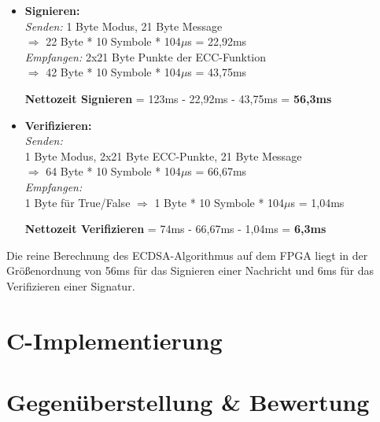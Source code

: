 \begin{itemize}
	\item \textbf{Signieren:}\\
\textit{Senden:} 
1 Byte Modus, 21 Byte Message\\
$\Rightarrow$ 22 Byte * 10 Symbole * 104$\mu$s = 22,92ms\\
\textit{Empfangen:} 
2x21 Byte Punkte der ECC-Funktion\\
$\Rightarrow$ 42 Byte  * 10 Symbole * 104$\mu$s = 43,75ms

\textbf{Nettozeit Signieren} = 123ms - 22,92ms - 43,75ms = \textbf{56,3ms}
	
	\item \textbf{Verifizieren:}\\
\textit{Senden:}\\
1 Byte Modus, 2x21 Byte ECC-Punkte, 21 Byte Message\\
$\Rightarrow$ 64 Byte * 10 Symbole * 104$\mu$s = 66,67ms\\
\textit{Empfangen:}\\
1 Byte für True/False
$\Rightarrow$ 1 Byte  * 10 Symbole * 104$\mu$s = 1,04ms

\textbf{Nettozeit Verifizieren} = 74ms - 66,67ms - 1,04ms = \textbf{6,3ms}\\
\end{itemize}

Die reine Berechnung des ECDSA-Algorithmus auf dem FPGA liegt in der Größenordnung von 56ms für das Signieren einer Nachricht und 6ms für das Verifizieren einer Signatur. \\

\section{C-Implementierung}



\section{Gegenüberstellung \& Bewertung}



